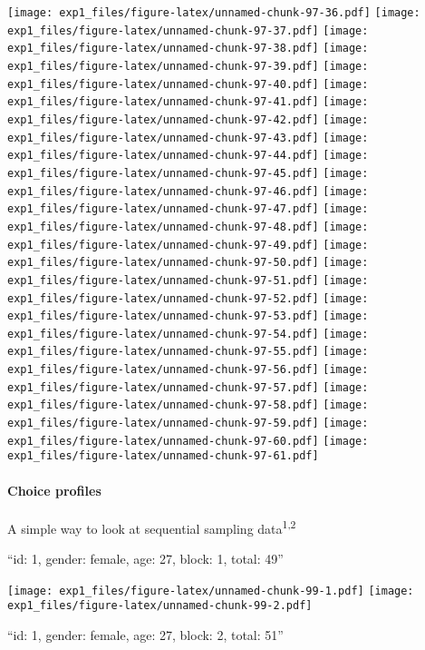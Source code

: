 \documentclass[,]{article}
\let\oldparagraph\paragraph
\renewcommand{\paragraph}[1]{\oldparagraph{#1}\mbox{}}
\newcommand*\cleartoleftpage{%
  \clearpage
  \ifodd\value{page}\hbox{}\newpage\fi
}
\begin{document}
\texttt{[image: exp1\_files/figure-latex/unnamed-chunk-97-36.pdf]}
\texttt{[image: exp1\_files/figure-latex/unnamed-chunk-97-37.pdf]}
\texttt{[image: exp1\_files/figure-latex/unnamed-chunk-97-38.pdf]}
\texttt{[image: exp1\_files/figure-latex/unnamed-chunk-97-39.pdf]}
\texttt{[image: exp1\_files/figure-latex/unnamed-chunk-97-40.pdf]}
\texttt{[image: exp1\_files/figure-latex/unnamed-chunk-97-41.pdf]}
\texttt{[image: exp1\_files/figure-latex/unnamed-chunk-97-42.pdf]}
\texttt{[image: exp1\_files/figure-latex/unnamed-chunk-97-43.pdf]}
\texttt{[image: exp1\_files/figure-latex/unnamed-chunk-97-44.pdf]}
\texttt{[image: exp1\_files/figure-latex/unnamed-chunk-97-45.pdf]}
\texttt{[image: exp1\_files/figure-latex/unnamed-chunk-97-46.pdf]}
\texttt{[image: exp1\_files/figure-latex/unnamed-chunk-97-47.pdf]}
\texttt{[image: exp1\_files/figure-latex/unnamed-chunk-97-48.pdf]}
\texttt{[image: exp1\_files/figure-latex/unnamed-chunk-97-49.pdf]}
\texttt{[image: exp1\_files/figure-latex/unnamed-chunk-97-50.pdf]}
\texttt{[image: exp1\_files/figure-latex/unnamed-chunk-97-51.pdf]}
\texttt{[image: exp1\_files/figure-latex/unnamed-chunk-97-52.pdf]}
\texttt{[image: exp1\_files/figure-latex/unnamed-chunk-97-53.pdf]}
\texttt{[image: exp1\_files/figure-latex/unnamed-chunk-97-54.pdf]}
\texttt{[image: exp1\_files/figure-latex/unnamed-chunk-97-55.pdf]}
\texttt{[image: exp1\_files/figure-latex/unnamed-chunk-97-56.pdf]}
\texttt{[image: exp1\_files/figure-latex/unnamed-chunk-97-57.pdf]}
\texttt{[image: exp1\_files/figure-latex/unnamed-chunk-97-58.pdf]}
\texttt{[image: exp1\_files/figure-latex/unnamed-chunk-97-59.pdf]}
\texttt{[image: exp1\_files/figure-latex/unnamed-chunk-97-60.pdf]}
\texttt{[image: exp1\_files/figure-latex/unnamed-chunk-97-61.pdf]}

\cleartoleftpage

\paragraph{Choice profiles}\label{choice-profiles}

A simple way to look at sequential sampling data\textsuperscript{1,2}

\newpage
[1] 

``id: 1, gender: female, age: 27, block: 1, total: 49''

\texttt{[image: exp1\_files/figure-latex/unnamed-chunk-99-1.pdf]}
\texttt{[image: exp1\_files/figure-latex/unnamed-chunk-99-2.pdf]}

\newpage
[1] 

``id: 1, gender: female, age: 27, block: 2, total: 51''
\end{document}
